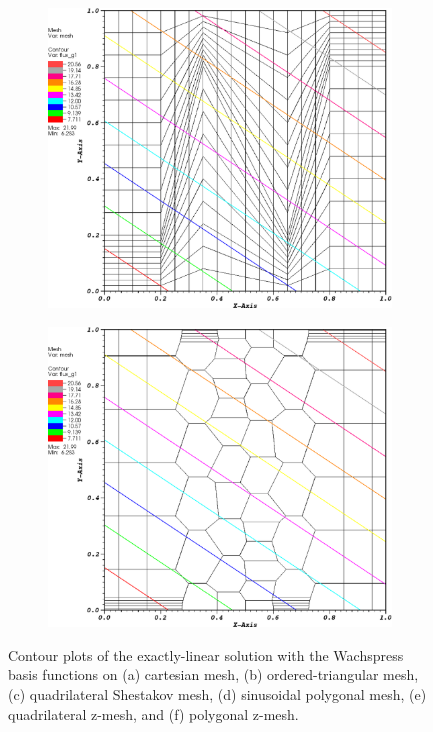 \begin{figure}
\begin{subfigure}[b]{0.45\textwidth}
		\caption{}
	\end{subfigure}
	\vfill
	\begin{subfigure}[b]{0.45\textwidth}
		\centering
		\label{subfig::z_quad_wach_lin_sol}
		\includegraphics[width=\textwidth]{figures/sec_BF/z_quad_WACHSPRESS_k1.eps}
		\caption{}
	\end{subfigure}
	\hfill
	\begin{subfigure}[b]{0.45\textwidth}
		\centering
		\label{subfig::z_poly_wach_lin_sol}
		\includegraphics[width=\textwidth]{figures/sec_BF/z_poly_WACHSPRESS_k1.eps}
		\caption{}
	\end{subfigure}
\caption{Contour plots of the exactly-linear solution with the Wachspress basis functions on (a) cartesian mesh, (b) ordered-triangular mesh, (c) quadrilateral Shestakov mesh, (d) sinusoidal polygonal mesh, (e) quadrilateral z-mesh, and (f) polygonal z-mesh.}
\label{fig::BF_Results_Linear_wach_sol}
\end{figure}

